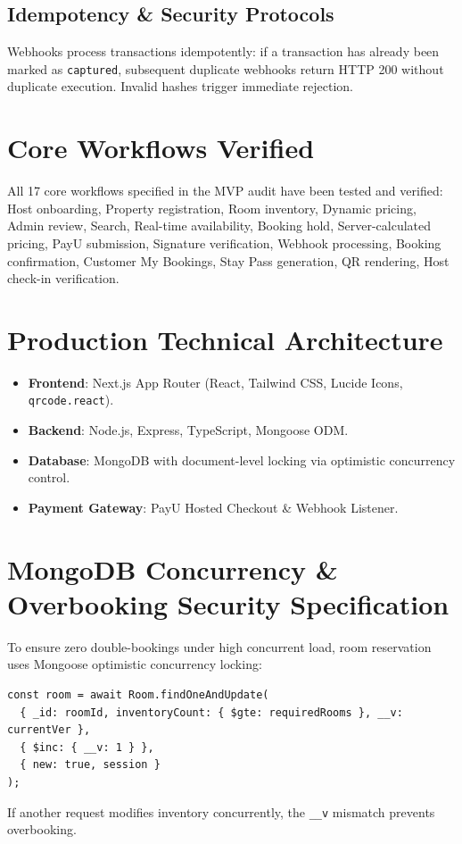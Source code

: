 \documentclass[11pt,a4paper]{article}
\begin{document}
\subsection{Idempotency \& Security Protocols}
Webhooks process transactions idempotently: if a transaction has already been marked as \texttt{captured}, subsequent duplicate webhooks return HTTP 200 without duplicate execution. Invalid hashes trigger immediate rejection.

\section{Core Workflows Verified}
All 17 core workflows specified in the MVP audit have been tested and verified:
Host onboarding, Property registration, Room inventory, Dynamic pricing, Admin review, Search, Real-time availability, Booking hold, Server-calculated pricing, PayU submission, Signature verification, Webhook processing, Booking confirmation, Customer My Bookings, Stay Pass generation, QR rendering, Host check-in verification.

\section{Production Technical Architecture}
\begin{itemize}
    \item \textbf{Frontend}: Next.js App Router (React, Tailwind CSS, Lucide Icons, \texttt{qrcode.react}).
    \item \textbf{Backend}: Node.js, Express, TypeScript, Mongoose ODM.
    \item \textbf{Database}: MongoDB with document-level locking via optimistic concurrency control.
    \item \textbf{Payment Gateway}: PayU Hosted Checkout & Webhook Listener.
\end{itemize}

\section{MongoDB Concurrency \& Overbooking Security Specification}
To ensure zero double-bookings under high concurrent load, room reservation uses Mongoose optimistic concurrency locking:
\begin{verbatim}
const room = await Room.findOneAndUpdate(
  { _id: roomId, inventoryCount: { $gte: requiredRooms }, __v: currentVer },
  { $inc: { __v: 1 } },
  { new: true, session }
);
\end{verbatim}
If another request modifies inventory concurrently, the \texttt{\_\_v} mismatch prevents overbooking.
\end{document}
